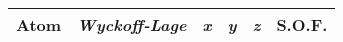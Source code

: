 \begin{tabular}{lcS[table-format = 1.5(2)]S[table-format = 1.5(2)]S[table-format = 1.5(2)]c}
\toprule
Atom	&\textit{\textit{Wyckoff}-Lage}	&{\textit{x}} &{\textit{y}}	&{\textit{z}} & S.O.F.\\
\midrule
\bottomrule
\end{tabular}